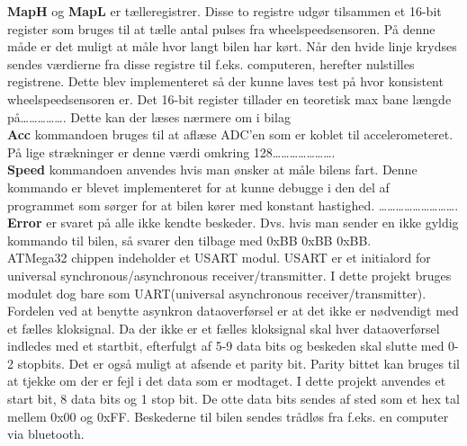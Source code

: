 \textbf{MapH} og \textbf{MapL} er tælleregistrer. Disse to registre udgør tilsammen et 16-bit register som bruges til at tælle antal pulses fra wheelspeedsensoren. På denne måde er det muligt at måle hvor langt bilen har kørt. Når den hvide linje krydses sendes værdierne fra disse registre til f.eks. computeren, herefter nulstilles registrene. Dette blev implementeret så der kunne laves test på hvor konsistent wheelspeedsensoren er. Det 16-bit register tillader en teoretisk max bane længde på……………. Dette kan der læses nærmere om i bilag  \\

\textbf{Acc} kommandoen bruges til at aflæse ADC’en som er koblet til accelerometeret. På lige strækninger er denne værdi omkring 128…………………. \\

\textbf{Speed} kommandoen anvendes hvis man ønsker at måle bilens fart. Denne kommando er blevet implementeret for at kunne debugge i den del af programmet som sørger for at bilen kører med konstant hastighed. ………………………. \\


\textbf{Error} er svaret på alle ikke kendte beskeder. Dvs. hvis man sender en ikke gyldig kommando til bilen, så svarer den tilbage med 0xBB 0xBB 0xBB. \\

ATMega32 chippen indeholder et USART modul. USART er et initialord for universal synchronous/asynchronous receiver/transmitter. I dette projekt bruges modulet dog bare som UART(universal asynchronous receiver/transmitter). Fordelen ved at benytte asynkron dataoverførsel er at det ikke er nødvendigt med et fælles kloksignal. Da der ikke er et fælles kloksignal skal hver dataoverførsel indledes med et startbit, efterfulgt af 5-9 data bits og beskeden skal slutte med 0-2 stopbits. Det er også muligt at afsende et parity bit. Parity bittet kan bruges til at tjekke om der er fejl i det data som er modtaget. I dette projekt anvendes et start bit, 8 data bits og 1 stop bit. De otte data bits sendes af sted som et hex tal mellem 0x00 og 0xFF. Beskederne til bilen sendes trådløs fra f.eks. en computer via bluetooth. \\

